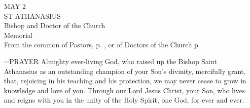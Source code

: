 \begin{center}\normalsize MAY 2\\
\footnotesize ST ATHANASIUS\\
\footnotesize Bishop and Doctor of the Church\\
\footnotesize Memorial\\
\footnotesize From the common of Pastors, p.    , or of Doctors of the Church p. \\
\end{center}

\hangindent=\parindent \small{PRAYER 
Almighty ever-living God,
who raised up the Bishop Saint Athanasius
as an outstanding champion of your Son's divinity,
mercifully grant,
that, rejoicing in his teaching and his protection,
we may never cease to grow in knowledge and love of you.
Through our Lord Jesus Christ, your Son,
who lives and reigns with you in the unity of the Holy Spirit,
one God, for ever and ever.\\}
 
